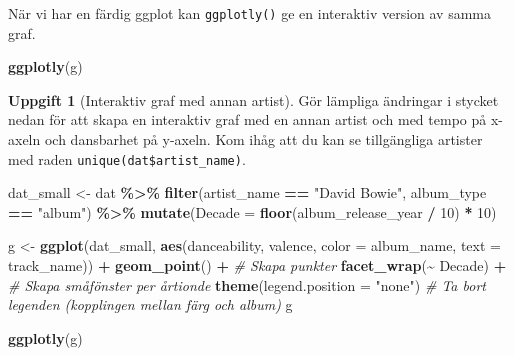 \documentclass[
]{book}
\newenvironment{Shaded}{\begin{snugshade}}{\end{snugshade}}
\newcommand{\AttributeTok}[1]{\textcolor[rgb]{0.13,0.29,0.53}{#1}}
\newcommand{\CommentTok}[1]{\textcolor[rgb]{0.56,0.35,0.01}{\textit{#1}}}
\newcommand{\DecValTok}[1]{\textcolor[rgb]{0.00,0.00,0.81}{#1}}
\newcommand{\FunctionTok}[1]{\textcolor[rgb]{0.13,0.29,0.53}{\textbf{#1}}}
\newcommand{\NormalTok}[1]{#1}
\newcommand{\OtherTok}[1]{\textcolor[rgb]{0.56,0.35,0.01}{#1}}
\newcommand{\SpecialCharTok}[1]{\textcolor[rgb]{0.81,0.36,0.00}{\textbf{#1}}}
\newcommand{\StringTok}[1]{\textcolor[rgb]{0.31,0.60,0.02}{#1}}
\theoremstyle{definition}
\theoremstyle{definition}
\theoremstyle{definition}
\newtheorem{exercise}{Uppgift}[chapter]
\theoremstyle{definition}
\theoremstyle{remark}
\begin{document}
När vi har en färdig ggplot kan \texttt{ggplotly()} ge en interaktiv version av samma graf.

\begin{Shaded}
\begin{Highlighting}[]
\FunctionTok{ggplotly}\NormalTok{(g)}
\end{Highlighting}
\end{Shaded}

\begin{exercise}[Interaktiv graf med annan artist]

Gör lämpliga ändringar i stycket nedan för att skapa en interaktiv graf med en annan artist och med tempo på x-axeln och dansbarhet på y-axeln. Kom ihåg att du kan se tillgängliga artister med raden \texttt{unique(dat\$artist\_name)}.

\begin{Shaded}
\begin{Highlighting}[]
\NormalTok{dat\_small }\OtherTok{\textless{}{-}}\NormalTok{ dat }\SpecialCharTok{\%\textgreater{}\%} 
  \FunctionTok{filter}\NormalTok{(artist\_name }\SpecialCharTok{==} \StringTok{"David Bowie"}\NormalTok{, album\_type }\SpecialCharTok{==} \StringTok{"album"}\NormalTok{) }\SpecialCharTok{\%\textgreater{}\%} 
  \FunctionTok{mutate}\NormalTok{(}\AttributeTok{Decade =} \FunctionTok{floor}\NormalTok{(album\_release\_year }\SpecialCharTok{/} \DecValTok{10}\NormalTok{) }\SpecialCharTok{*} \DecValTok{10}\NormalTok{)}

\NormalTok{g }\OtherTok{\textless{}{-}} \FunctionTok{ggplot}\NormalTok{(dat\_small, }\FunctionTok{aes}\NormalTok{(danceability, valence, }\AttributeTok{color =}\NormalTok{ album\_name, }\AttributeTok{text =}\NormalTok{ track\_name)) }\SpecialCharTok{+}
  \FunctionTok{geom\_point}\NormalTok{() }\SpecialCharTok{+}                                 \CommentTok{\# Skapa punkter}
  \FunctionTok{facet\_wrap}\NormalTok{(}\SpecialCharTok{\textasciitilde{}}\NormalTok{ Decade) }\SpecialCharTok{+}                         \CommentTok{\# Skapa småfönster per årtionde}
  \FunctionTok{theme}\NormalTok{(}\AttributeTok{legend.position =} \StringTok{"none"}\NormalTok{)                }\CommentTok{\# Ta bort legenden (kopplingen mellan färg och album)}
\NormalTok{g}

\FunctionTok{ggplotly}\NormalTok{(g)}
\end{Highlighting}
\end{Shaded}

\end{exercise}
\end{document}
